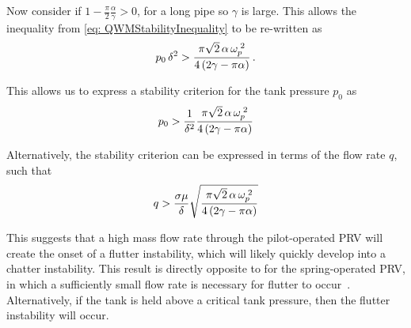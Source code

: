 Now consider if $1 - \frac{\pi}{2} \frac{\alpha}{\gamma} > 0$, for a long pipe so $\gamma$ is large. This allows the inequality from \cref{eq: QWMStabilityInequality} to be re-written as
~
\begin{equation*}
    p_0 \, \delta^2 > \frac{\pi \sqrt{2} \, \alpha \, \omega_p^{\;2}}{4 \left( 2 \gamma - \pi \alpha \right)} \, .
\end{equation*}

This allows us to express a stability criterion for the tank pressure $p_0$ as
~
\begin{equation*}
    p_0 > \frac{1}{\delta^2} \frac{\pi \sqrt{2} \, \alpha \, \omega_p^{\;2}}{4 \left( 2 \gamma - \pi \alpha \right) }
\end{equation*}

Alternatively, the stability criterion can be expressed in terms of the flow rate $q$, such that
~
\begin{equation*}
    q > \frac{\sigma \mu}{\delta} \sqrt{
    \frac{\pi \sqrt{2} \, \alpha \, \omega_p^{\;2}}{4 \left( 2 \gamma - \pi \alpha \right) }
    }
\end{equation*}

This suggests that a high mass flow rate through the pilot-operated PRV will create the onset of a flutter instability, which will likely quickly develop into a chatter instability. This result is directly opposite to for the spring-operated PRV, in which a sufficiently small flow rate is necessary for flutter to occur~\cite{Hos2015ModelPipe,Hos2016DynamicService}. Alternatively, if the tank is held above a critical tank pressure, then the flutter instability will occur.

